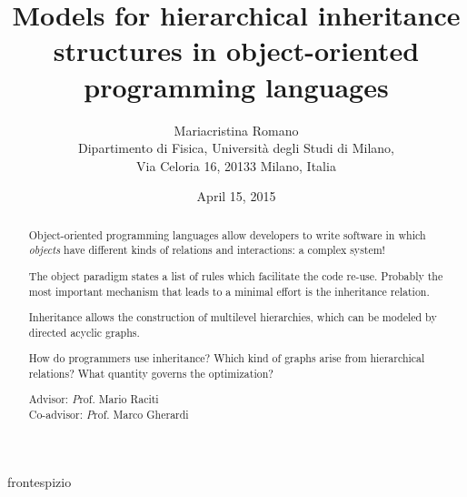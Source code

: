 \documentclass[12pt, a4paper,titlepage,openright,twoside]{report}
\begin{document}
\title{\huge \textbf{Models for hierarchical inheritance structures in object-oriented programming languages}}
\author{Mariacristina Romano\\
Dipartimento di Fisica, Universit\`a degli Studi di Milano,\\
Via Celoria 16, 20133 Milano, Italia}
 {frontespizio} %
\date{April 15, 2015}
\newpage\null\thispagestyle{empty}\newpage %
\thispagestyle{empty}
\maketitle
\newpage\null\thispagestyle{empty}\newpage
\begin{abstract}
\center
Object-oriented programming languages allow developers to write software in which \textit{objects} have different kinds of relations and interactions: a complex system!

\vspace{0.5cm}
The object paradigm states a list of rules which facilitate the code re-use. Probably the most important mechanism that leads to a minimal effort is the inheritance relation.

\vspace{0.5cm}
Inheritance allows the construction of multilevel hierarchies, which can be modeled by directed acyclic graphs.

\vspace{0.5cm}
How do programmers use inheritance? Which kind of graphs arise from hierarchical relations? What quantity governs the optimization?

\vskip1.75cm
\hskip4.5cm
\parbox[b]{7cm}
{
Advisor: {\textit Prof. Mario Raciti}\\
Co-advisor: {\textit Prof. Marco Gherardi}
}
\end{abstract}
\newpage\null\thispagestyle{empty}\newpage
\tableofcontents
\newpage\null\thispagestyle{empty}\newpage
\clearpage{\pagestyle{empty}\cleardoublepage}
\end{document}
